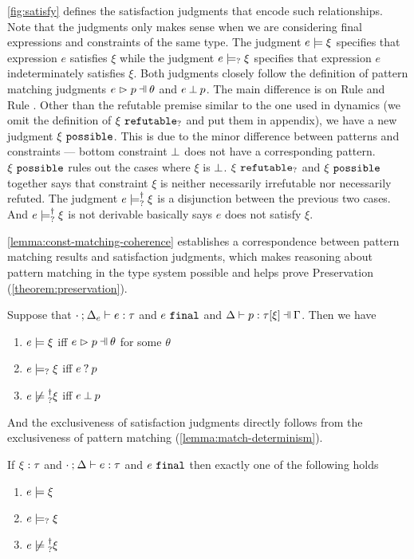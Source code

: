 \autoref{fig:satisfy} defines the satisfaction judgments that encode such relationships.
Note that the judgments only makes sense when we are considering 
final expressions and constraints of the same type. 
The
judgment $e \models \xi$ specifies that expression $e$ satisfies $\xi$ while
the judgment $e \models_{?} \xi$ specifies that expression $e$ indeterminately satisfies $\xi$. Both judgments closely follow the definition of pattern matching judgments $\hpatmatch{e}{p}{\theta}$ and $e \mathbin{\bot} p$. The main difference is on Rule \CSNotIntroPair and Rule \CMSNotIntro. Other than the refutable premise similar to the one used in dynamics (we omit the definition of $\xi ~\mathtt{refutable}_?$ and put them in appendix), we have a new judgment $\xi ~\mathtt{possible}$. This is due to the minor difference between patterns and constraints --- bottom constraint $\bot$ does not have a corresponding pattern.
$\xi ~\mathtt{possible}$ rules out the cases where $\xi$ is $\bot$. $\xi ~\mathtt{refutable}_?$ and $\xi ~\mathtt{possible}$ together says that constraint $\xi$ is neither necessarily irrefutable nor necessarily refuted.
The judgment $e \models_{?}^{\dag} \xi$ is a disjunction between the
previous two cases. 
And $e \models_{?}^{\dag} \xi$ is not derivable basically says $e$ does not satisfy $\xi$.

\autoref{lemma:const-matching-coherence} establishes a correspondence
between pattern matching results and satisfaction judgments, which makes
reasoning about pattern matching in the type system possible and helps prove Preservation (\autoref{theorem:preservation}).

\begin{lemma}
  \label{lemma:const-matching-coherence}
  Suppose that $\cdot \mathbin{;} \Delta_e \vdash e : \tau$ and $e ~\mathtt{final}$ and $\chpattyp{p}{\tau}{\xi}{\Gamma}{\Delta}$. Then we have
  \begin{enumerate}
  \item $e \models \xi$ iff $\hpatmatch{e}{p}{\theta}$ for some $\theta$
  \item $e \models_{?} \xi$ iff $e \mathbin{?} p$
  \item $\cnotsatisfyormay{e}{\xi}$ iff $e \mathbin{\bot} p$
  \end{enumerate}
\end{lemma}

And the exclusiveness of satisfaction judgments directly follows from the exclusiveness of pattern matching (\autoref{lemma:match-determinism}).
\begin{theorem}
  \label{theorem:exclusive-constraint-satisfaction}
  If $\xi : \tau$ and $\cdot \mathbin{;} \Delta \vdash e : \tau$ and $e ~\mathtt{final}$ then exactly one of the following holds
  \begin{enumerate}
  \item $e \models \xi$
  \item $e \models_{?} \xi$
  \item $\cnotsatisfyormay{e}{\xi}$
  \end{enumerate}
\end{theorem}


